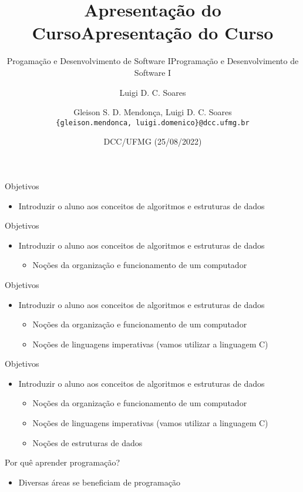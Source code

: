 \documentclass[t, aspectratio=169]{beamer}
\author{Luigi D. C. Soares}
\date{DCC/UFMG (25/08/2022)}
\title{Apresentação do Curso}
\subtitle{Progamação e Desenvolvimento de Software I}
\title[Apresentação do Curso]{Apresentação do Curso}
\subtitle{Programação e Desenvolvimento de Software I}
\author[\tiny\{gleison.mendonca, luigi.domenico\}@dcc.ufmg.br]{%
Gleison S. D. Mendonça, Luigi D. C. Soares\texorpdfstring{\\}{}
\texttt{\{gleison.mendonca, luigi.domenico\}@dcc.ufmg.br}}
\institute[DCC/UFMG]{}
\date[25/08/2022]{}
\begin{document}
\maketitle


\begin{frame}[label={sec:org9b1cefb}]{Objetivos}
\begin{itemize}
\item Introduzir o aluno aos conceitos de \alert{algoritmos} e \alert{estruturas de dados}
\end{itemize}
\end{frame}

\begin{frame}[label={sec:org8567f7d}]{Objetivos}
\begin{itemize}
\item Introduzir o aluno aos conceitos de \alert{algoritmos} e \alert{estruturas de dados}
\begin{itemize}
\item Noções da organização e funcionamento de um computador
\end{itemize}
\end{itemize}
\end{frame}

\begin{frame}[label={sec:org5b01a2f}]{Objetivos}
\begin{itemize}
\item Introduzir o aluno aos conceitos de \alert{algoritmos} e \alert{estruturas de dados}
\begin{itemize}
\item Noções da organização e funcionamento de um computador
\item Noções de linguagens imperativas (vamos utilizar a linguagem C)
\end{itemize}
\end{itemize}
\end{frame}

\begin{frame}[label={sec:orgb93d7b4}]{Objetivos}
\begin{itemize}
\item Introduzir o aluno aos conceitos de \alert{algoritmos} e \alert{estruturas de dados}
\begin{itemize}
\item Noções da organização e funcionamento de um computador
\item Noções de linguagens imperativas (vamos utilizar a linguagem C)
\item Noções de estruturas de dados
\end{itemize}
\end{itemize}
\end{frame}
\begin{frame}[label={sec:orgc4a274b}]{Por quê aprender programação?}
\begin{itemize}
\item Diversas áreas se beneficiam de programação
\end{itemize}
\end{frame}
\end{document}
